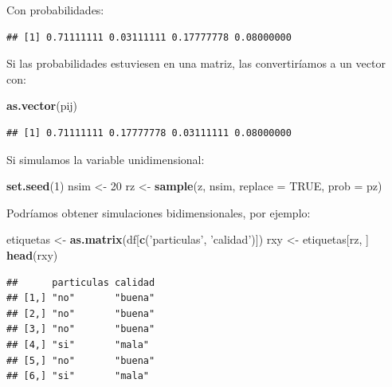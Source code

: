 \documentclass[
]{book}
\newenvironment{Shaded}{\begin{snugshade}}{\end{snugshade}}
\newcommand{\DataTypeTok}[1]{\textcolor[rgb]{0.13,0.29,0.53}{#1}}
\newcommand{\DecValTok}[1]{\textcolor[rgb]{0.00,0.00,0.81}{#1}}
\newcommand{\KeywordTok}[1]{\textcolor[rgb]{0.13,0.29,0.53}{\textbf{#1}}}
\newcommand{\NormalTok}[1]{#1}
\newcommand{\OperatorTok}[1]{\textcolor[rgb]{0.81,0.36,0.00}{\textbf{#1}}}
\newcommand{\OtherTok}[1]{\textcolor[rgb]{0.56,0.35,0.01}{#1}}
\newcommand{\StringTok}[1]{\textcolor[rgb]{0.31,0.60,0.02}{#1}}
\theoremstyle{break}
\theoremstyle{definition}
\theoremstyle{definition}
\theoremstyle{definition}
\theoremstyle{remark}
\begin{document}
Con probabilidades:

\begin{Shaded}
\end{Shaded}

\begin{verbatim}
## [1] 0.71111111 0.03111111 0.17777778 0.08000000
\end{verbatim}

Si las probabilidades estuviesen en una matriz, las convertiríamos a un
vector con:

\begin{Shaded}
\begin{Highlighting}[]
\KeywordTok{as.vector}\NormalTok{(pij)}
\end{Highlighting}
\end{Shaded}

\begin{verbatim}
## [1] 0.71111111 0.17777778 0.03111111 0.08000000
\end{verbatim}

Si simulamos la variable unidimensional:

\begin{Shaded}
\begin{Highlighting}[]
\KeywordTok{set.seed}\NormalTok{(}\DecValTok{1}\NormalTok{)}
\NormalTok{nsim <-}\StringTok{ }\DecValTok{20}
\NormalTok{rz <-}\StringTok{ }\KeywordTok{sample}\NormalTok{(z, nsim, }\DataTypeTok{replace =} \OtherTok{TRUE}\NormalTok{, }\DataTypeTok{prob =}\NormalTok{ pz)}
\end{Highlighting}
\end{Shaded}

Podríamos obtener simulaciones bidimensionales, por ejemplo:

\begin{Shaded}
\begin{Highlighting}[]
\NormalTok{etiquetas <-}\StringTok{ }\KeywordTok{as.matrix}\NormalTok{(df[}\KeywordTok{c}\NormalTok{(}\StringTok{'particulas'}\NormalTok{, }\StringTok{'calidad'}\NormalTok{)])}
\NormalTok{rxy <-}\StringTok{ }\NormalTok{etiquetas[rz, ]}
\KeywordTok{head}\NormalTok{(rxy)}
\end{Highlighting}
\end{Shaded}

\begin{verbatim}
##      particulas calidad
## [1,] "no"       "buena"
## [2,] "no"       "buena"
## [3,] "no"       "buena"
## [4,] "si"       "mala" 
## [5,] "no"       "buena"
## [6,] "si"       "mala"
\end{verbatim}
\end{document}
